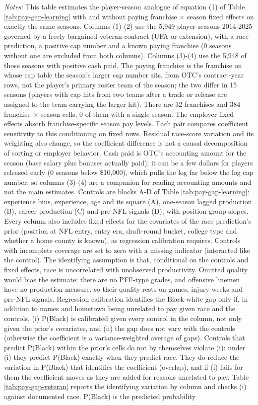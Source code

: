 {\footnotesize
\noindent\textit{Notes:} This table estimates the player-season analogue of equation (1) of Table \ref{tab:pay-gap-learning} with and without paying franchise $\times$ season fixed effects on exactly the same seasons. Columns (1)-(2) use the 5,949 player-seasons 2014-2025 governed by a freely bargained veteran contract (UFA or extension), with a race prediction, a positive cap number and a known paying franchise (0 seasons without one are excluded from both columns). Columns (3)-(4) use the 5,948 of those seasons with positive cash paid. The paying franchise is the franchise on whose cap table the season's larger cap number sits, from OTC's contract-year rows, not the player's primary roster team of the season; the two differ in 15 seasons (players with cap hits from two teams after a trade or release are assigned to the team carrying the larger hit). There are 32 franchises and 384 franchise $\times$ season cells, 0 of them with a single season. The employer fixed effects absorb franchise-specific season pay levels. Each pair compares coefficient sensitivity to this conditioning on fixed rows. Residual race-score variation and its weighting also change, so the coefficient difference is not a causal decomposition of sorting or employer behavior. Cash paid is OTC's accounting amount for the season (base salary plus bonuses actually paid); it can be a few dollars for players released early (0 seasons below \$10,000), which pulls the log far below the log cap number, so columns (3)-(4) are a companion for reading accounting amounts and not the main estimates. Controls are blocks A-D of Table \ref{tab:pay-gap-learning}: experience bins, experience, age and its square (A), one-season lagged production (B), career production (C) and pre-NFL signals (D), with position-group slopes. Every column also includes fixed effects for the covariates of the race prediction's prior (position at NFL entry, entry era, draft-round bucket, college type and whether a home county is known), as regression calibration requires. Controls with incomplete coverage are set to zero with a missing indicator (interacted like the control). The identifying assumption is that, conditional on the controls and fixed effects, race is uncorrelated with unobserved productivity. Omitted quality would bias the estimate: there are no PFF-type grades, and offensive linemen have no production measure, so their quality rests on games, injury weeks and pre-NFL signals. Regression calibration identifies the Black-white gap only if, in addition to names and hometown being unrelated to pay given race and the controls, (i) P(Black) is calibrated given every control in the column, not only given the prior's covariates, and (ii) the gap does not vary with the controls (otherwise the coefficient is a variance-weighted average of gaps). Controls that predict P(Black) within the prior's cells do not by themselves violate (i): under (i) they predict P(Black) exactly when they predict race. They do reduce the variation in P(Black) that identifies the coefficient (overlap), and if (i) fails for them the coefficient moves as they are added for reasons unrelated to pay. Table \ref{tab:pay-gap-veteran} reports the identifying variation by column and checks (i) against documented race. P(Black) is the predicted probability }
